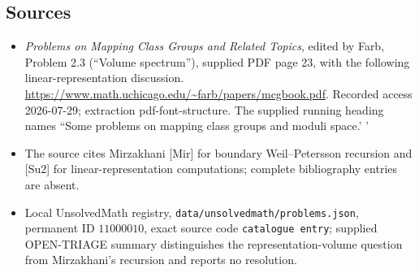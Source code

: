 \documentclass[11pt]{article}
\begin{document}
\subsection{Sources}
\begin{itemize}
\item \emph{Problems on Mapping Class Groups and Related Topics}, edited by Farb, Problem 2.3 (``Volume spectrum''), supplied PDF page 23, with the following linear-representation discussion. \url{https://www.math.uchicago.edu/~farb/papers/mcgbook.pdf}. Recorded access 2026-07-29; extraction pdf-font-structure. The supplied running heading names ``Some problems on mapping class groups and moduli space.' '
\item The source cites Mirzakhani [Mir] for boundary Weil--Petersson recursion and [Su2] for linear-representation computations; complete bibliography entries are absent.
\item Local UnsolvedMath registry, \texttt{data/unsolvedmath/problems.json}, permanent ID \(11000010\), exact source code \texttt{catalogue entry}; supplied OPEN-TRIAGE summary distinguishes the representation-volume question from Mirzakhani's recursion and reports no resolution.
\end{itemize}
\end{document}
